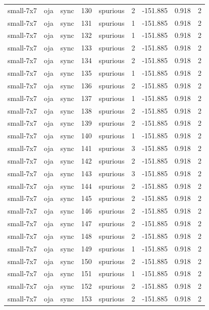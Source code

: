 \begin{tabular}{lllrlrrrr}
small-7x7 & oja & sync & 130 & spurious & 2 & -151.885 & 0.918 & 2 \\
small-7x7 & oja & sync & 131 & spurious & 1 & -151.885 & 0.918 & 2 \\
small-7x7 & oja & sync & 132 & spurious & 1 & -151.885 & 0.918 & 2 \\
small-7x7 & oja & sync & 133 & spurious & 2 & -151.885 & 0.918 & 2 \\
small-7x7 & oja & sync & 134 & spurious & 2 & -151.885 & 0.918 & 2 \\
small-7x7 & oja & sync & 135 & spurious & 1 & -151.885 & 0.918 & 2 \\
small-7x7 & oja & sync & 136 & spurious & 2 & -151.885 & 0.918 & 2 \\
small-7x7 & oja & sync & 137 & spurious & 1 & -151.885 & 0.918 & 2 \\
small-7x7 & oja & sync & 138 & spurious & 2 & -151.885 & 0.918 & 2 \\
small-7x7 & oja & sync & 139 & spurious & 2 & -151.885 & 0.918 & 2 \\
small-7x7 & oja & sync & 140 & spurious & 1 & -151.885 & 0.918 & 2 \\
small-7x7 & oja & sync & 141 & spurious & 3 & -151.885 & 0.918 & 2 \\
small-7x7 & oja & sync & 142 & spurious & 2 & -151.885 & 0.918 & 2 \\
small-7x7 & oja & sync & 143 & spurious & 3 & -151.885 & 0.918 & 2 \\
small-7x7 & oja & sync & 144 & spurious & 2 & -151.885 & 0.918 & 2 \\
small-7x7 & oja & sync & 145 & spurious & 2 & -151.885 & 0.918 & 2 \\
small-7x7 & oja & sync & 146 & spurious & 2 & -151.885 & 0.918 & 2 \\
small-7x7 & oja & sync & 147 & spurious & 2 & -151.885 & 0.918 & 2 \\
small-7x7 & oja & sync & 148 & spurious & 2 & -151.885 & 0.918 & 2 \\
small-7x7 & oja & sync & 149 & spurious & 1 & -151.885 & 0.918 & 2 \\
small-7x7 & oja & sync & 150 & spurious & 2 & -151.885 & 0.918 & 2 \\
small-7x7 & oja & sync & 151 & spurious & 1 & -151.885 & 0.918 & 2 \\
small-7x7 & oja & sync & 152 & spurious & 2 & -151.885 & 0.918 & 2 \\
small-7x7 & oja & sync & 153 & spurious & 2 & -151.885 & 0.918 & 2 \\

\end{tabular}
